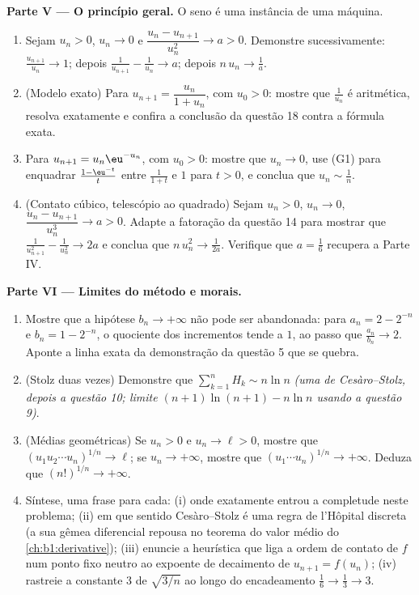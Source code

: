 \begin{problem}[{Problema de fim de semana --- o teorema de Cesàro--Stolz
e a assintótica $u_n \sim \sqrt{3/n}$ para $u_{n+1} = \sin
u_n$}]
\medskip
\noindent\textbf{Parte V --- O princípio geral.} O seno é
uma instância de uma máquina.
\begin{enumerate}
  \item Sejam $u_n > 0$, $u_n \to 0$ e $\dfrac{u_n -
        u_{n+1}}{u_n^{2}} \to a > 0$. Demonstre sucessivamente:
        $\frac{u_{n+1}}{u_n} \to 1$; depois $\frac{1}{u_{n+1}} -
        \frac{1}{u_n} \to a$; depois $n\,u_n \to \frac1a$.
  \item (Modelo exato) Para $u_{n+1} = \dfrac{u_n}{1 + u_n}$, com $u_0
        > 0$: mostre que $\frac{1}{u_n}$ é aritmética, resolva exatamente
        e confira a conclusão da questão 18 contra a fórmula exata.
  \item Para $u_{n+1} = u_n \eu^{-u_n}$, com $u_0 > 0$: mostre que $u_n \to
        0$, use (G1) para enquadrar $\frac{1 - \eu^{-t}}{t}$ entre
        $\frac{1}{1+t}$ e $1$ para $t > 0$, e conclua que $u_n
        \sim \frac 1n$.
  \item (Contato cúbico, telescópio ao quadrado) Sejam $u_n > 0$, $u_n
        \to 0$, $\dfrac{u_n - u_{n+1}}{u_n^{3}} \to a > 0$.
        Adapte a fatoração da questão 14 para mostrar que
        $\frac{1}{u_{n+1}^2} - \frac{1}{u_n^2} \to 2a$ e
        conclua que $n\,u_n^{2} \to \frac{1}{2a}$. Verifique que $a =
        \frac16$ recupera a Parte IV.
\end{enumerate}

\medskip
\noindent\textbf{Parte VI --- Limites do método e morais.}
\begin{enumerate}
  \item Mostre que a hipótese $b_n \to +\infty$ não pode ser
        abandonada: para $a_n = 2 - 2^{-n}$ e $b_n = 1 - 2^{-n}$,
        o quociente dos incrementos tende a $1$, ao passo que $\frac{a_n}
        {b_n} \to 2$. Aponte a linha exata da demonstração da questão 5
        que se quebra.
  \item (Stolz duas vezes) Demonstre que $\sum_{k=1}^{n} H_k \sim n \ln n$
        \emph{(uma  de Cesàro--Stolz, depois a questão
        10; limite $(n+1)\ln(n+1) - n\ln n$ usando a questão 9)}.
  \item (Médias geométricas) Se $u_n > 0$ e $u_n \to \ell > 0$,
        mostre que $(u_1 u_2 \cdots u_n)^{1/n} \to \ell$; se $u_n \to
        +\infty$,
        mostre que $(u_1 \cdots u_n)^{1/n} \to +\infty$.
        Deduza que $(n!)^{1/n} \to +\infty$.
  \item Síntese, uma frase para cada: (i) onde exatamente entrou a
        completude neste problema; (ii) em que sentido
        Cesàro--Stolz é uma regra de l'Hôpital discreta (a sua gêmea
        diferencial repousa no teorema do valor médio do
        \cref{ch:b1:derivative}); (iii) enuncie a heurística que
        liga a ordem de contato de $f$ num ponto fixo neutro
        ao expoente de decaimento de $u_{n+1} = f(u_n)$;
        (iv) rastreie a constante $3$ de $\sqrt{3/n}$ ao longo do
        encadeamento $\frac16 \to \frac13 \to 3$.
\end{enumerate}
\end{problem}
